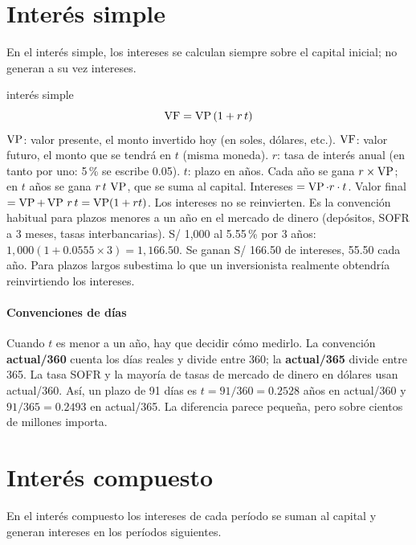 \section{Interés simple}

En el interés simple, los intereses se calculan siempre sobre el capital inicial; no generan a su vez intereses.

\begin{ficha}{interés simple}
\[ \operatorname{VF} = \operatorname{VP}\,(1+r\,t) \]
 $\operatorname{VP}$: valor presente, el monto invertido hoy (en soles, dólares, etc.). $\operatorname{VF}$: valor futuro, el monto que se tendrá en $t$ (misma moneda). $r$: tasa de interés anual (en tanto por uno: 5\,\% se escribe 0.05). $t$: plazo en años.
 Cada año se gana $r\times\operatorname{VP}$; en $t$ años se gana $r\,t\,\operatorname{VP}$, que se suma al capital.
 Intereses $=\operatorname{VP}\cdot r\cdot t$. Valor final $=\operatorname{VP}+\operatorname{VP}\,r\,t=\operatorname{VP}(1+rt)$.
 Los intereses no se reinvierten. Es la convención habitual para plazos menores a un año en el mercado de dinero (depósitos, SOFR a 3 meses, tasas interbancarias).
 S/ 1,000 al 5.55\,\% por 3 años: $1{,}000(1+0.0555\times3)=1{,}166.50$.
 Se ganan S/ 166.50 de intereses, 55.50 cada año.
 Para plazos largos subestima lo que un inversionista realmente obtendría reinvirtiendo los intereses.
\end{ficha}

\paragraph{Convenciones de días} Cuando $t$ es menor a un año, hay que decidir cómo medirlo. La convención \textbf{actual/360} cuenta los días reales y divide entre 360; la \textbf{actual/365} divide entre 365. La tasa SOFR y la mayoría de tasas de mercado de dinero en dólares usan actual/360. Así, un plazo de 91 días es $t=91/360=0.2528$ años en actual/360 y $91/365=0.2493$ en actual/365. La diferencia parece pequeña, pero sobre cientos de millones importa.

\section{Interés compuesto}

En el interés compuesto los intereses de cada período se suman al capital y generan intereses en los períodos siguientes.

